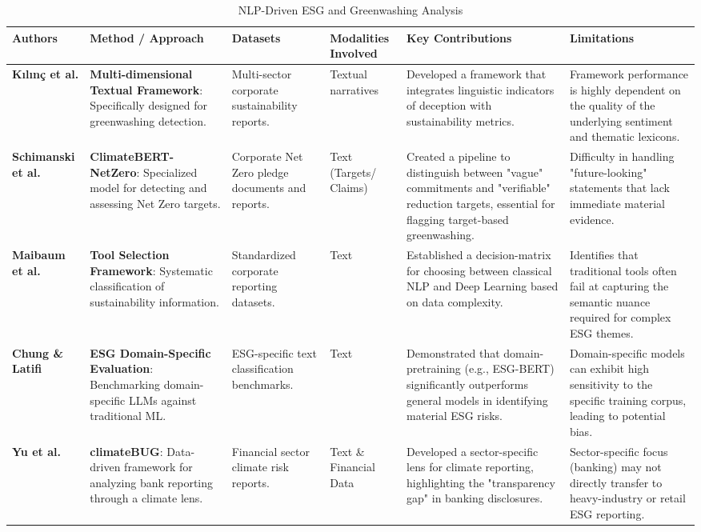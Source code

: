 \begin{landscape}
\begin{table}[p]
\centering
\caption{NLP-Driven ESG and Greenwashing Analysis}
\label{tab:nlp-driven-esg-greenwashing}
\small
\renewcommand{\arraystretch}{1.2}
\begin{tabularx}{\linewidth}{|p{1.8cm}|X|X|p{1.8cm}|X|X|}
\hline
Authors & Method / Approach & Datasets & Modalities Involved & Key Contributions & Limitations \\ \hline
\textbf{Kılınç et al.}  \parencite{yavuz_k_l_n__64e32f80} & \textbf{Multi-dimensional Textual Framework}: Specifically designed for greenwashing detection. & Multi-sector corporate sustainability reports. & Textual narratives & Developed a framework that integrates linguistic indicators of deception with sustainability metrics. & Framework performance is highly dependent on the quality of the underlying sentiment and thematic lexicons. \\ \hline
\textbf{Schimanski et al.}  \parencite{tobias_schimanski_241ada20} & \textbf{ClimateBERT-NetZero}: Specialized model for detecting and assessing Net Zero targets. & Corporate Net Zero pledge documents and reports. & Text (Targets/ Claims) & Created a pipeline to distinguish between "vague" commitments and "verifiable" reduction targets, essential for flagging target-based greenwashing. & Difficulty in handling "future-looking" statements that lack immediate material evidence. \\ \hline
\textbf{Maibaum et al.}  \parencite{frederik_maibaum_b8629037} & \textbf{Tool Selection Framework}: Systematic classification of sustainability information. & Standardized corporate reporting datasets. & Text & Established a decision-matrix for choosing between classical NLP and Deep Learning based on data complexity. & Identifies that traditional tools often fail at capturing the semantic nuance required for complex ESG themes. \\ \hline
\textbf{Chung \& Latifi}  \parencite{tae_sun_chung_e16a4c18} & \textbf{ESG Domain-Specific Evaluation}: Benchmarking domain-specific LLMs against traditional ML. & ESG-specific text classification benchmarks. & Text & Demonstrated that domain-pretraining (e.g., ESG-BERT) significantly outperforms general models in identifying material ESG risks. & Domain-specific models can exhibit high sensitivity to the specific training corpus, leading to potential bias. \\ \hline
\textbf{Yu et al.}  \parencite{yinan_yu_e282fd98} & \textbf{climateBUG}: Data-driven framework for analyzing bank reporting through a climate lens. & Financial sector climate risk reports. & Text \& Financial Data & Developed a sector-specific lens for climate reporting, highlighting the "transparency gap" in banking disclosures. & Sector-specific focus (banking) may not directly transfer to heavy-industry or retail ESG reporting. \\ \hline

\end{tabularx}
\end{table}
\end{landscape}
